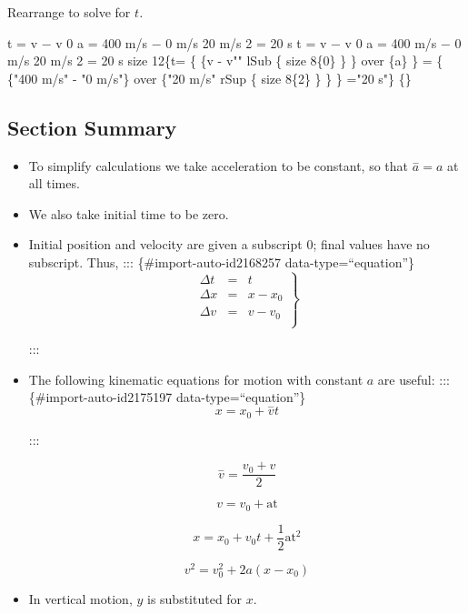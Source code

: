 \documentclass[
]{book}
\begin{document}
Rearrange to solve for \(t{}\)\emph{.}

\leavevmode{}%
{t = v − v 0 a = 400 m/s − 0 m/s 20 m/s 2 = 20 s t = v − v 0 a = 400
m/s − 0 m/s 20 m/s 2 = 20 s size 12\{t= \{ \{v - v"" lSub \{ size 8\{0\} \} \}
over \{a\} \} = \{ \{"400 m/s" - "0 m/s"\} over \{"20 m/s" rSup \{ size
8\{2\} \} \} \} ="20 s"\} \{\}}

\hypertarget{fs-id1164906426121-summary}{}
\hypertarget{section-summary-4}{%
\subsection{Section Summary}\label{section-summary-4}}

\begin{itemize}
\item
  \protect\hypertarget{import-auto-id2171459}{}{To simplify calculations we take acceleration to be constant, so
  that \({\overset{-}{a} = a}{}\) at all times.}
\item
  \protect\hypertarget{import-auto-id2168260}{}{We also take initial time to be zero.}
\item
  \protect\hypertarget{import-auto-id2167408}{}{Initial position and velocity are given a subscript 0; final values
  have no subscript. Thus,}
  ::: \{\#import-auto-id2168257 data-type=``equation''\}
  \[\left. \begin{array}{lll}
  {\Delta t} & = & t \\
  {\Delta x} & = & {x - x_{0}} \\
  {\Delta v} & = & {v - v_{0}} \\
  \end{array} \right\}\]

  :::
\item
  \protect\hypertarget{import-auto-id2175179}{}{The following kinematic equations for motion with constant \(a{}\)
  are useful:}
  ::: \{\#import-auto-id2175197 data-type=``equation''\}
  \[{{x = {x_{0} + \overset{-}{v}}}t}{}\]

  :::

  \leavevmode{}%
  \[{\overset{-}{v} = \frac{v_{0} + v}{2}}{}\]

  \leavevmode{}%
  \[{v = {v_{0} + \text{at}}}{}\]

  \leavevmode{}%
  \[{{x = {x_{0} + v_{0}}}{t + \frac{1}{2}}\text{at}^{2}}{}\]

  \leavevmode{}%
  \[{{v^{2} = {v_{0}^{2} + 2a}}\left( {x - x_{0}} \right)}{}\]
\item
  \protect\hypertarget{import-auto-id2176131}{}{In vertical motion, \(y{}\) is substituted for
  \(x{}\).}
\end{itemize}
\end{document}
